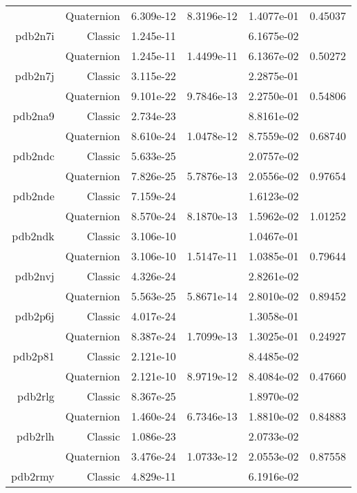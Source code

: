 \begin{xltabular}{\textwidth}{r|rS[table-format=1.3e+2]S[table-format=1.4e+2]S[table-format=1.4e+2]S[table-format=-1.5]}
& Quaternion & 6.309e-12 & 8.3196e-12 & 1.4077e-01 & 0.45037\\  \addlinespace
pdb2n7i & Classic & 1.245e-11 &  & 6.1675e-02 & \\
& Quaternion & 1.245e-11 & 1.4499e-11 & 6.1367e-02 & 0.50272\\  \addlinespace
pdb2n7j & Classic & 3.115e-22 &  & 2.2875e-01 & \\
& Quaternion & 9.101e-22 & 9.7846e-13 & 2.2750e-01 & 0.54806\\  \addlinespace
pdb2na9 & Classic & 2.734e-23 &  & 8.8161e-02 & \\
& Quaternion & 8.610e-24 & 1.0478e-12 & 8.7559e-02 & 0.68740\\  \addlinespace
pdb2ndc & Classic & 5.633e-25 &  & 2.0757e-02 & \\
& Quaternion & 7.826e-25 & 5.7876e-13 & 2.0556e-02 & 0.97654\\  \addlinespace
pdb2nde & Classic & 7.159e-24 &  & 1.6123e-02 & \\
& Quaternion & 8.570e-24 & 8.1870e-13 & 1.5962e-02 & 1.01252\\  \addlinespace
pdb2ndk & Classic & 3.106e-10 &  & 1.0467e-01 & \\
& Quaternion & 3.106e-10 & 1.5147e-11 & 1.0385e-01 & 0.79644\\  \addlinespace
pdb2nvj & Classic & 4.326e-24 &  & 2.8261e-02 & \\
& Quaternion & 5.563e-25 & 5.8671e-14 & 2.8010e-02 & 0.89452\\  \addlinespace
pdb2p6j & Classic & 4.017e-24 &  & 1.3058e-01 & \\
& Quaternion & 8.387e-24 & 1.7099e-13 & 1.3025e-01 & 0.24927\\  \addlinespace
pdb2p81 & Classic & 2.121e-10 &  & 8.4485e-02 & \\
& Quaternion & 2.121e-10 & 8.9719e-12 & 8.4084e-02 & 0.47660\\  \addlinespace
pdb2rlg & Classic & 8.367e-25 &  & 1.8970e-02 & \\
& Quaternion & 1.460e-24 & 6.7346e-13 & 1.8810e-02 & 0.84883\\  \addlinespace
pdb2rlh & Classic & 1.086e-23 &  & 2.0733e-02 & \\
& Quaternion & 3.476e-24 & 1.0733e-12 & 2.0553e-02 & 0.87558\\  \addlinespace
pdb2rmy & Classic & 4.829e-11 &  & 6.1916e-02 & \\

\end{xltabular}
